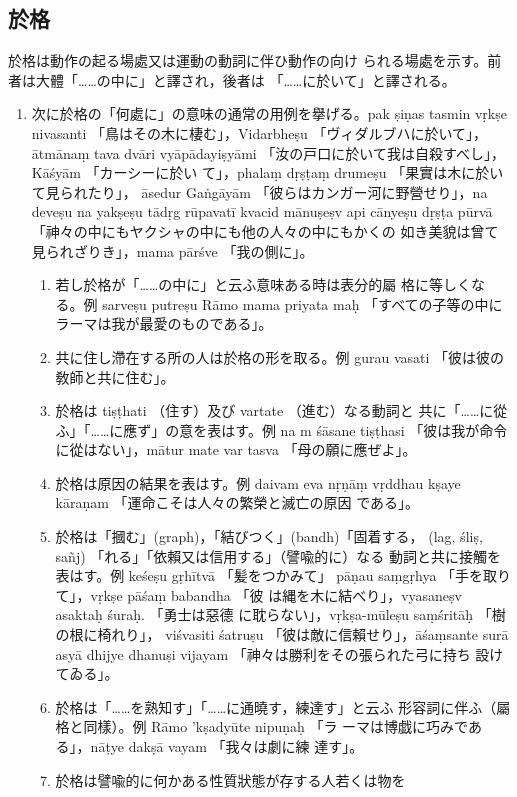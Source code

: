 \subsection{於格}
\numberParagraph
於格は動作の起る場處又は運動の動詞に伴ひ動作の向け
られる場處を示す。前者は大體「……の中に」と譯され，後者は
「……に於いて」と譯される。
\begin{enumerate}[label=(\arabic*)]
\item 次に於格の「何處に」の意味の通常の用例を擧げる。pak\-%
ṣiṇas tasmin vṛkṣe nivasanti 「鳥はその木に棲む」，Vidarbheṣu
「ヴィダルブハに於いて」，ātmānaṃ tava dvāri vyāpādayiṣyāmi
「汝の戸口に於いて我は自殺すべし」，Kāśyām 「カーシーに於い
て」，phalaṃ dṛṣṭaṃ drumeṣu 「果實は木に於いて見られたり」，
āsedur Gaṅgāyām 「彼らはカンガー河に野營せり」，na deveṣu na
yakṣeṣu tādṛg rūpavatī kvacid mānuṣeṣv api cānyeṣu dṛṣṭa\-%
pūrvā 「神々の中にもヤクシャの中にも他の人々の中にもかくの
如き美貌は曾て見られざりき」，mama pārśve 「我の側に」。
\begin{enumerate}[label=(\alph*)]
\item 若し於格が「……の中に」と云ふ意味ある時は表分的屬
格に等しくなる。例 sarveṣu putreṣu Rāmo mama priyata\-%
maḥ 「すべての子等の中にラーマは我が最愛のものである」。
\item 共に住し滯在する所の人は於格の形を取る。例 gurau
vasati 「彼は彼の敎師と共に住む」。
\item 於格は tiṣṭhati （住す）及び vartate （進む）なる動詞と
共に「……に從ふ」「……に應ず」の意を表はす。例 na m
śāsane tiṣṭhasi 「彼は我が命令に從はない」，mātur mate var\-%
tasva 「母の願に應ぜよ」。
\item 於格は原因の結果を表はす。例 daivam eva nṛṇāṃ
vṛddhau kṣaye kāraṇam 「運命こそは人々の繁榮と滅亡の原因
である」。
\item 於格は「摑む」(graph)，「結びつく」(bandh)「固着する，
(lag, śliṣ, sañj) 「れる」「依賴又は信用する」（譬喩的に）なる
動詞と共に接觸を表はす。例 keśeṣu gṛhītvā 「髪をつかみて」
pāṇau saṃgṛhya 「手を取りて」，vṛkṣe pāśaṃ babandha 「彼
は縄を木に結べり」，vyasaneṣv asaktaḥ śuraḥ. 「勇士は惡德
に耽らない」，vṛkṣa-mūleṣu saṃśritāḥ 「樹の根に椅れり」，
viśvasiti śatruṣu 「彼は敵に信賴せり」，āśaṃsante surā asyā\-%
dhijye dhanuṣi vijayam 「神々は勝利をその張られた弓に持ち
設けてゐる」。
\item 於格は「……を熟知す」「……に通曉す，練達す」と云ふ
形容詞に伴ふ（屬格と同樣）。例 Rāmo 'kṣadyūte nipuṇaḥ 「ラ
ーマは博戯に巧みである」，nāṭye dakṣā vayam 「我々は劇に練
達す」。
\item 於格は譬喩的に何かある性質狀態が存する人若くは物を

\end{enumerate}
\end{enumerate}

